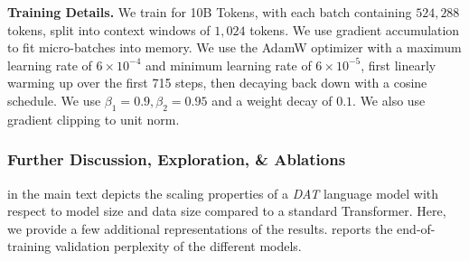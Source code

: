 \textbf{Training Details.} We train for 10B Tokens, with each batch containing $524,288$ tokens, split into context windows of $1,024$ tokens. We use gradient accumulation to fit micro-batches into memory. We use the AdamW optimizer with a maximum learning rate of $6 \times 10^{-4}$ and minimum learning rate of $6 \times 10^{-5}$, first linearly warming up over the first 715 steps, then decaying back down with a cosine schedule. We use $\beta_1 = 0.9, \beta_2 = 0.95$ and a weight decay of $0.1$. We also use gradient clipping to unit norm.

\subsubsection*{Further Discussion, Exploration, \& Ablations}


 in the main text depicts the scaling properties of a \textit{DAT} language model with respect to model size and data size compared to a standard Transformer. Here, we provide a few additional representations of the results.  reports the end-of-training validation perplexity of the different models. 


